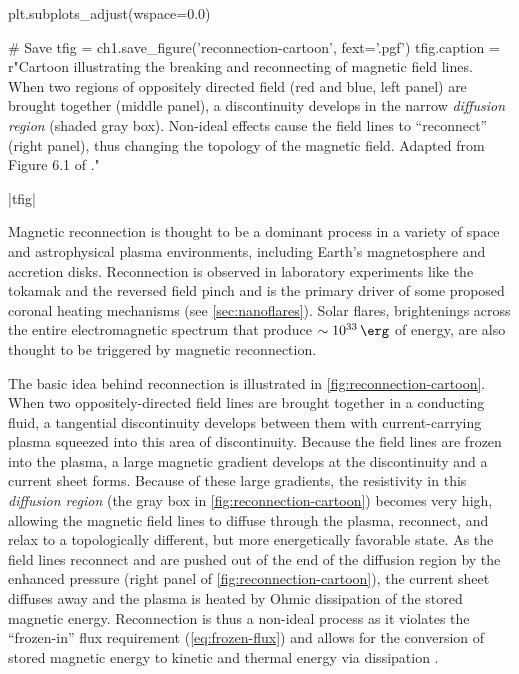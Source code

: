 \begin{pycode}[chapter1]
plt.subplots_adjust(wspace=0.0)

# Save
tfig = ch1.save_figure('reconnection-cartoon', fext='.pgf')
tfig.caption = r"Cartoon illustrating the breaking and reconnecting of magnetic field lines. When two regions of oppositely directed field (red and blue, left panel) are brought together (middle panel), a discontinuity develops in the narrow \textit{diffusion region} (shaded gray box). Non-ideal effects cause the field lines to ``reconnect'' (right panel), thus changing the topology of the magnetic field. Adapted from Figure 6.1 of \citet{priest_magnetohydrodynamics_2014}."
\end{pycode}
\py[chapter1]|tfig|

Magnetic reconnection is thought to be a dominant process in a variety of space and astrophysical plasma environments, including Earth's magnetosphere and accretion disks. Reconnection is observed in laboratory experiments like the tokamak and the reversed field pinch \citep{priest_magnetic_2000} and is the primary driver of some proposed coronal heating mechanisms (see \autoref{sec:nanoflares}). Solar flares, brightenings across the entire electromagnetic spectrum that produce $\sim\SI{e33}{\erg}$ of energy, are also thought to be triggered by magnetic reconnection.

The basic idea behind reconnection is illustrated in \autoref{fig:reconnection-cartoon}. When two oppositely-directed field lines are brought together in a conducting fluid, a tangential discontinuity develops between them with current-carrying plasma squeezed into this area of discontinuity. Because the field lines are frozen into the plasma, a large magnetic gradient develops at the discontinuity and a current sheet forms. Because of these large gradients, the resistivity in this \textit{diffusion region} (the gray box in \autoref{fig:reconnection-cartoon}) becomes very high, allowing the magnetic field lines to diffuse through the plasma, reconnect, and relax to a topologically different, but more energetically favorable state. As the field lines reconnect and are pushed out of the end of the diffusion region by the enhanced pressure (right panel of \autoref{fig:reconnection-cartoon}), the current sheet diffuses away and the plasma is heated by Ohmic dissipation of the stored magnetic energy. Reconnection is thus a non-ideal process as it violates the ``frozen-in'' flux requirement (\autoref{eq:frozen-flux}) and allows for the conversion of stored magnetic energy to kinetic and thermal energy via dissipation \citep{priest_magnetic_2000,priest_magnetohydrodynamics_2014}.

